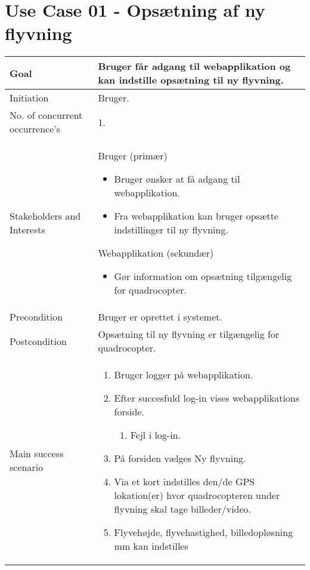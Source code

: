 \section{Use Case 01 - Opsætning af ny flyvning}

\begin{table}[H]
\begin{tabular}{|l|p{10cm}|}
\hline

Goal	 								& Bruger får adgang til webapplikation og kan indstille opsætning til ny flyvning. \\\hline
Initiation 							& Bruger. \\\hline
No. of concurrent occurrence’s		& 1. \\\hline
Stakeholders	and Interests			& Bruger (primær) 
										\begin{itemize}
											\item Bruger ønsker at få adgang til webapplikation.
											\item Fra webapplikation kan bruger opsætte indstillinger til ny flyvning.
										\end{itemize} 
									  Webapplikation (sekundær)
										\begin{itemize}
											\item Gør information om opsætning tilgængelig for quadrocopter.
										\end{itemize} \\\hline
Precondition							& Bruger er oprettet i systemet. \\\hline
Postcondition						& Opsætning til ny flyvning er tilgængelig for quadrocopter. \\\hline
Main success scenario				&
 
									\renewcommand{\labelenumi}{\arabic{enumi}.}
									\renewcommand{\labelenumii}{\Roman{enumii}:}

									\begin{enumerate}[topsep=0.0cm, leftmargin=0.5cm]
										\item Bruger logger på webapplikation.
										\item Efter succesfuld log-in vises webapplikations forside.
											\begin{enumerate}[partopsep=4cm, topsep=0cm, leftmargin=1cm]
												\item Fejl i log-in.
											\end{enumerate}
										\item På forsiden vælges Ny flyvning.
										\item Via et kort indstilles den/de GPS lokation(er) hvor quadrocopteren under flyvning skal tage billeder/video.	
										\item Flyvehøjde, flyvehastighed, billedopløsning mm kan indstilles
									\end{enumerate} \\\hline	


\end{tabular}
\end{table}
